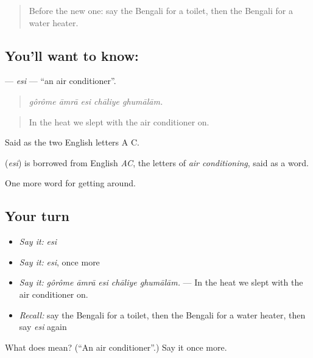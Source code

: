 \begin{quote}
Before the new one: say the Bengali for a toilet, then the Bengali for a water heater.
\end{quote}

\subsection*{You'll want to know: }
\textbf{} — \emph{esi} — \textquotedblleft{}an air conditioner\textquotedblright{}.

\begin{quote}
    
\end{quote}

\begin{quote}
\emph{gôrôme āmrā esi chāliye ghumālām.}
\end{quote}

\begin{quote}
In the heat we slept with the air conditioner on.
\end{quote}

Said as the two English letters A C.

\begin{cousinweb}
\textbf{} (\emph{esi}) is borrowed from English \emph{AC}, the letters of \emph{air conditioning}, said as a word.
\end{cousinweb}

\begin{grammarlens}[title={What you've built}]
One more word for getting around.
\end{grammarlens}

\subsection*{Your turn}
\begin{itemize}
\raggedright
  \item \emph{Say it:} \emph{esi}
  \item \emph{Say it:} \emph{esi}, once more
  \item \emph{Say it:} \emph{gôrôme āmrā esi chāliye ghumālām.} — In the heat we slept with the air conditioner on.
  \item \emph{Recall:} say the Bengali for a toilet, then the Bengali for a water heater, then say \emph{esi} again
\end{itemize}

\begin{tcolorbox}[breakable,colback=teal!4,colframe=teal!35!black,title={Before you move on}]
What does  mean? (\textquotedblleft{}An air conditioner\textquotedblright{}.) Say it once more.
\end{tcolorbox}
